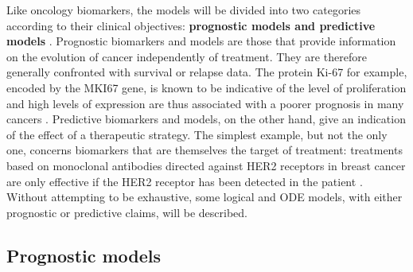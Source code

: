 \documentclass[a4paper,12pt,twoside,onecolumn,openright,final,oldfontcommands]{memoir}
\begin{document}
Like oncology biomarkers, the models will be divided into two categories
according to their clinical objectives: \textbf{prognostic models and
predictive models} \citep{oldenhuis2008prognostic}. Prognostic
biomarkers and models are those that provide information on the
evolution of cancer independently of treatment. They are therefore
generally confronted with survival or relapse data. The protein Ki-67
for example, encoded by the MKI67 gene, is known to be indicative of the
level of proliferation and high levels of expression are thus associated
with a poorer prognosis in many cancers \citep{sawyers2008cancer}.
Predictive biomarkers and models, on the other hand, give an indication
of the effect of a therapeutic strategy. The simplest example, but not
the only one, concerns biomarkers that are themselves the target of
treatment: treatments based on monoclonal antibodies directed against
HER2 receptors in breast cancer are only effective if the HER2 receptor
has been detected in the patient \citep{sawyers2008cancer}. Without
attempting to be exhaustive, some logical and ODE models, with either
prognostic or predictive claims, will be described.

\subsection{Prognostic models}\label{prognostic-models}
\end{document}
